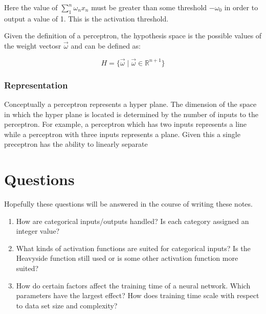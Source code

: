\documentclass{article}
\begin{document}
	Here the value of $\sum_{1}^{n}\omega_{n}x_{n}$ must be greater than some threshold $-\omega_{0}$ in order to output a value of 1. This is the activation threshold.
	
	Given the definition of a perceptron, the hypothesis space is the possible values of the weight vectosr $\vec{\omega}$ and can be defined as:
	
	\[ H = \{ \vec{\omega} \mid \vec{\omega} \in \mathbb{R}^{n+1} \} \]
	
	\subsubsection{Representation}
	
	Conceptually a perceptron represents a hyper plane. The dimension of the space in which the hyper plane is located is determined by the number of inputs to the perceptron. For example, a perceptron which has two inputs represents a line while a perceptron with three inputs represents a plane. Given this a single preceptron has the ability to linearly separate 

	\section{Questions}
	Hopefully these questions will be answered in the course of writing these notes.
	
	\begin{enumerate}
		\item How are categorical inputs/outputs handled? Is each category assigned an integer value?
		\item What kinds of activation functions are suited for categorical inputs? Is the Heavyside function still used or is some other activation function more suited?
		\item How do certain factors affect the training time of a neural network. Which parameters have the largest effect? How does training time scale with respect to data set size and complexity?
	\end{enumerate}
\end{document}
